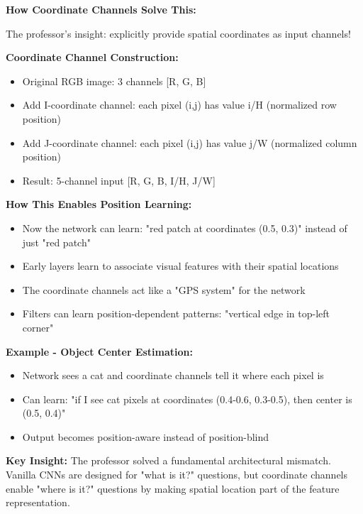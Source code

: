 \documentclass[12pt]{article}
\newcommand{\explanation}[1]{{\color{explanationcolor}#1}}
\begin{document}
\begin{enumerate}[(a)]
{    \textbf{How Coordinate Channels Solve This:}
    
    \explanation{
    The professor's insight: explicitly provide spatial coordinates as input channels!
    
    \textbf{Coordinate Channel Construction:}
    \begin{itemize}
        \item Original RGB image: 3 channels [R, G, B]
        \item Add I-coordinate channel: each pixel (i,j) has value i/H (normalized row position)
        \item Add J-coordinate channel: each pixel (i,j) has value j/W (normalized column position)
        \item Result: 5-channel input [R, G, B, I/H, J/W]
    \end{itemize}
    
    \textbf{How This Enables Position Learning:}
    \begin{itemize}
        \item Now the network can learn: "red patch at coordinates (0.5, 0.3)" instead of just "red patch"
        \item Early layers learn to associate visual features with their spatial locations
        \item The coordinate channels act like a "GPS system" for the network
        \item Filters can learn position-dependent patterns: "vertical edge in top-left corner"
    \end{itemize}
    
    \textbf{Example - Object Center Estimation:}
    \begin{itemize}
        \item Network sees a cat and coordinate channels tell it where each pixel is
        \item Can learn: "if I see cat pixels at coordinates (0.4-0.6, 0.3-0.5), then center is (0.5, 0.4)"
        \item Output becomes position-aware instead of position-blind
    \end{itemize}
    }
    
    \textbf{Key Insight:}
    \explanation{
    The professor solved a fundamental architectural mismatch. Vanilla CNNs are designed for "what is it?" questions, but coordinate channels enable "where is it?" questions by making spatial location part of the feature representation.
    }
    }
    

\end{enumerate}
\end{document}
